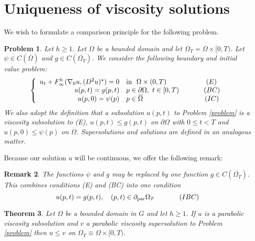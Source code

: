 \documentclass[12pt]{amsart}
\newtheorem{thm}{Theorem}[section]
\newtheorem{problem}[thm]{Problem}
\newtheorem{remark}[thm]{Remark}
\theoremstyle{definition}
\theoremstyle{remark}
\numberwithin{equation}{section}
\begin{document}
\section{Uniqueness of viscosity solutions}
We wish to formulate a comparison principle for the following problem.
\begin{problem}\label{mainprob}
Let $h \geq 1$. Let $\Omega$ be a bounded domain and let $\Omega_T=\Omega\times [0,T)$. 
Let $\psi \in C(\overline{\Omega})$ and $g \in C(\overline{\Omega_T})$. We consider the following boundary and initial value problem:
\begin{eqnarray}\label{problem}
\left\{\begin{array}{rl}
 u_t+F^h_\infty(\nabla_0 u, (D^2u)^\star) = 0 & \textmd{in}\ \ \Omega \times (0,T)  \hspace{.8in}(E)\\
u(p,t)=g(p,t) & p \in \partial \Omega,\ t \in [0,T)\hspace{.5in} (BC)\\
u(p,0) = \psi(p) & p \in \overline{\Omega}\hspace{1.25in}(IC)
\end{array}\right.
\end{eqnarray}
We also adopt the definition that a subsolution $u(p,t)$ to Problem \ref{problem} is a viscosity subsolution to (E), $u(p,t) \leq g(p,t)$ on $\partial \Omega$ with $0 \leq t < T$ and $u(p,0) \leq \psi(p)$ on $\overline{\Omega}$.  Supersolutions and solutions are defined in an analogous matter. 
\end{problem}
Because our solution $u$ will be continuous, we offer the following remark: 
\begin{remark}
The functions $\psi$ and $g$ may be replaced by one function $g\in C(\overline{\Omega_T})$. This combines conditions (E) and (BC) into one condition 
\begin{equation}
u(p,t)=g(p,t),\ \ \  (p,t) \in \partial_{\operatorname{par}} \Omega_T \hspace{.5in} (IBC)
\end{equation}
\end{remark} 
\begin{thm}\label{pinf}
Let $\Omega$ be a bounded domain in $G$ and let $h\geq 1$.   If $u$ is a parabolic viscosity subsolution and $v$ a parabolic viscosity supersolution to Problem \eqref{problem} then $u \leq v$ on $\Omega_T\equiv\Omega\times [0,T) $.
\end{thm}
\end{document}
